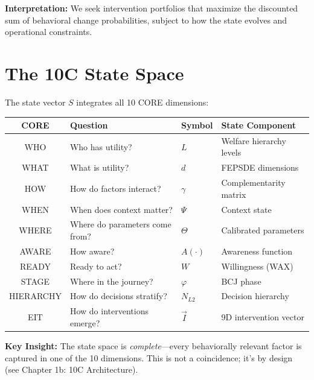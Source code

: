 \textbf{Interpretation:} We seek intervention portfolios that maximize the discounted sum of behavioral change probabilities, subject to how the state evolves and operational constraints.


\section{The 10C State Space}
\label{sec:25-state-space}

The state vector $S$ integrates all 10 CORE dimensions:

\begin{tcolorbox}[colback=green!5!white,colframe=green!75!black,
    title=\textbf{10C State Space Mapping}]
\begin{center}
\begin{tabular}{|c|l|l|l|}
\hline
\textbf{CORE} & \textbf{Question} & \textbf{Symbol} & \textbf{State Component} \\
\hline
WHO & Who has utility? & $L$ & Welfare hierarchy levels \\
WHAT & What is utility? & $d$ & FEPSDE dimensions \\
HOW & How do factors interact? & $\gamma$ & Complementarity matrix \\
WHEN & When does context matter? & $\Psi$ & Context state \\
WHERE & Where do parameters come from? & $\Theta$ & Calibrated parameters \\
AWARE & How aware? & $A(\cdot)$ & Awareness function \\
READY & Ready to act? & $W$ & Willingness (WAX) \\
STAGE & Where in the journey? & $\varphi$ & BCJ phase \\
HIERARCHY & How do decisions stratify? & $N_{L2}$ & Decision hierarchy \\
EIT & How do interventions emerge? & $\vec{I}$ & 9D intervention vector \\
\hline
\end{tabular}
\end{center}
\end{tcolorbox}

\textbf{Key Insight:} The state space is \textit{complete}---every behaviorally relevant factor is captured in one of the 10 dimensions. This is not a coincidence; it's by design (see Chapter 1b: 10C Architecture).


